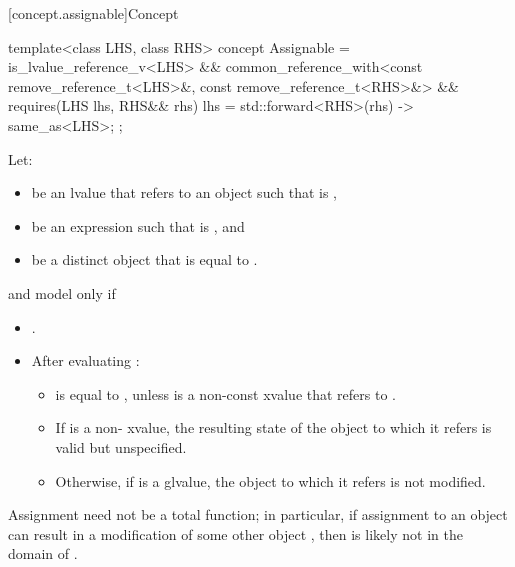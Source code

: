 [concept.assignable]{Concept }

%
\begin{itemdecl}
template<class LHS, class RHS>
  concept Assignable =
    is_lvalue_reference_v<LHS> &&
    common_reference_with<const remove_reference_t<LHS>&, const remove_reference_t<RHS>&> &&
    requires(LHS lhs, RHS&& rhs) {
      { lhs = std::forward<RHS>(rhs) } -> same_as<LHS>;
    };
\end{itemdecl}

\begin{itemdescr}
\pnum
Let:
\begin{itemize}
\item {} be an lvalue that refers to an object  such that
   is ,
\item {} be an expression such that  is
  , and
\item {} be a distinct object that is equal to .
\end{itemize}
 and  model
 only if

\begin{itemize}
\item {}.

\item After evaluating :

\begin{itemize}
\item {} is equal to , unless  is a non-const
xvalue that refers to .

\item If  is a non- xvalue, the resulting state of the
object to which it refers is valid but unspecified.

\item Otherwise, if  is a glvalue, the object to which it refers is
  not modified.
\end{itemize}
\end{itemize}

\pnum
\begin{note}
Assignment need not be a total function;
in particular, if assignment to an object  can result in a modification
of some other object , then  is likely not in the domain
of \tcode{=}.
\end{note}
\end{itemdescr}

